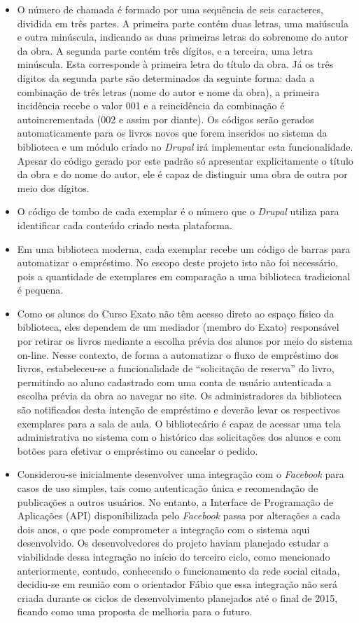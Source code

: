 \documentclass[a4paper]{article}
\begin{document}
\begin{itemize}
\item O número de chamada é formado por uma sequência de seis caracteres, dividida em três partes. A primeira parte contém duas letras, uma maiúscula e outra minúscula, indicando as duas primeiras letras do sobrenome do autor da obra. A segunda parte contém três dígitos, e a terceira, uma letra minúscula. Esta corresponde à primeira letra do título da obra. Já os três dígitos da segunda parte são determinados da seguinte forma: dada a combinação de três letras (nome do autor e nome da obra), a primeira incidência recebe o valor 001 e a reincidência da combinação é autoincrementada (002 e assim por diante). Os códigos serão gerados automaticamente para os livros novos que forem inseridos no sistema da biblioteca e um módulo criado no \textit{Drupal} irá implementar esta funcionalidade. Apesar do código gerado por este padrão só apresentar explicitamente o título da obra e do nome do autor, ele é capaz de distinguir uma obra de outra por meio dos dígitos.

\item O código de tombo de cada exemplar é o número que o \textit{Drupal} utiliza para identificar cada conteúdo criado nesta plataforma.

\item Em uma biblioteca moderna, cada exemplar recebe um código de barras para automatizar o empréstimo. No escopo deste projeto isto não foi necessário, pois a quantidade de exemplares em comparação a uma biblioteca tradicional é pequena.

\item Como os alunos do Curso Exato não têm acesso direto ao espaço físico da biblioteca, eles dependem de um mediador (membro do Exato) responsável por retirar os livros mediante a escolha prévia dos alunos por meio do sistema on-line.  Nesse contexto, de forma a automatizar o fluxo de empréstimo dos livros, estabeleceu-se a funcionalidade de “solicitação de reserva” do livro, permitindo ao aluno cadastrado com uma conta de usuário autenticada a escolha prévia da obra ao navegar no site. Os administradores da biblioteca são notificados desta intenção de empréstimo e deverão levar os respectivos exemplares para a sala de aula. O bibliotecário é capaz de acessar uma tela administrativa no sistema com o histórico das solicitações dos alunos e com botões para efetivar o empréstimo ou cancelar o pedido.

\item Considerou-se inicialmente desenvolver uma integração com o \textit{Facebook} para casos de uso simples, tais como autenticação única e recomendação de publicações a outros usuários. No entanto, a Interface de Programação de Aplicações (API) disponibilizada pelo \textit{Facebook} passa por alterações a cada dois anos, o que pode comprometer a integração com o sistema aqui desenvolvido. Os  desenvolvedores do projeto haviam planejado estudar a viabilidade dessa integração no início do terceiro ciclo, como mencionado anteriormente, contudo, conhecendo o funcionamento da rede social citada, decidiu-se em reunião com o orientador Fábio que essa integração não será criada durante os ciclos de desenvolvimento planejados até o final de 2015, ficando como uma proposta de melhoria para o futuro.


\end{itemize}
\end{document}
